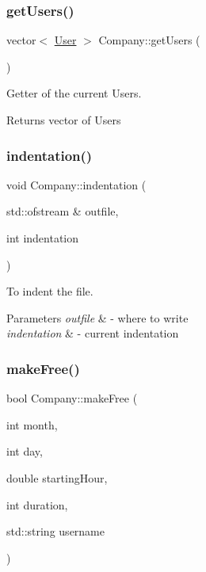 \subsubsection{\texorpdfstring{get\+Users()}{getUsers()}}
{\footnotesize\ttfamily vector$<$ \mbox{\hyperlink{class_user}{User}} $>$ Company\+::get\+Users (\begin{DoxyParamCaption}{ }\end{DoxyParamCaption})}



Getter of the current Users. 

\begin{DoxyReturn}{Returns}
vector of Users 
\end{DoxyReturn}
\mbox{\label{class_company_aa8b5bbb3b2d49d13f36d4fcdfc0d20d1}} 
\subsubsection{\texorpdfstring{indentation()}{indentation()}}
{\footnotesize\ttfamily void Company\+::indentation (\begin{DoxyParamCaption}\item[{std\+::ofstream \&}]{outfile,  }\item[{int}]{indentation }\end{DoxyParamCaption})}



To indent the file. 


\begin{DoxyParams}{Parameters}
{\em outfile} & -\/ where to write \\
\hline
{\em indentation} & -\/ current indentation \\
\hline
\end{DoxyParams}
\mbox{\label{class_company_a56fa75dd66690eae0853a3f3278220e3}} 
\subsubsection{\texorpdfstring{make\+Free()}{makeFree()}}
{\footnotesize\ttfamily bool Company\+::make\+Free (\begin{DoxyParamCaption}\item[{int}]{month,  }\item[{int}]{day,  }\item[{double}]{starting\+Hour,  }\item[{int}]{duration,  }\item[{std\+::string}]{username }\end{DoxyParamCaption})}



